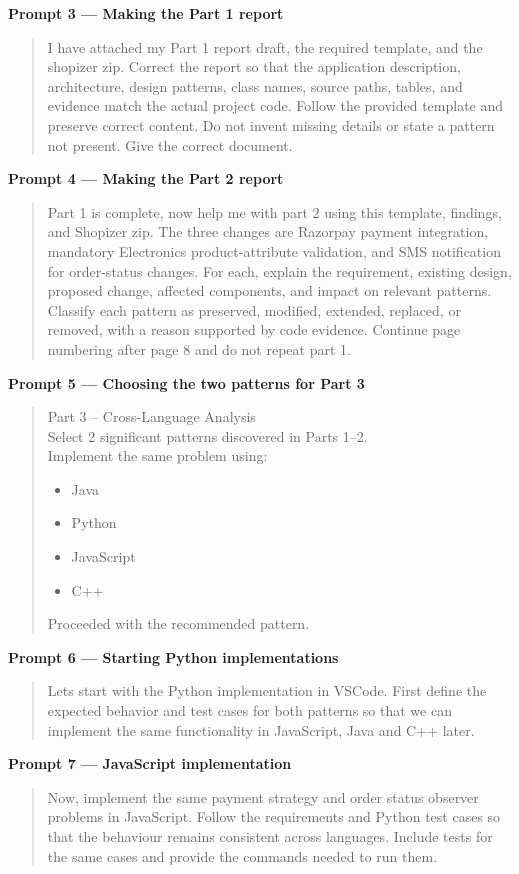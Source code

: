 \documentclass[11pt,a4paper]{article}
\begin{document}
\textbf{Prompt 3 --- Making the Part 1 report}
\begin{quote}\small
I have attached my Part 1 report draft, the required template, and the shopizer zip. Correct the report so that the application description, architecture, design patterns, class names, source paths, tables, and evidence match the actual project code. Follow the provided template and preserve correct content. Do not invent missing details or state a pattern not present. Give the correct document.
\end{quote}

\textbf{Prompt 4 --- Making the Part 2 report}
\begin{quote}\small
Part 1 is complete, now help me with part 2 using this template, findings, and Shopizer zip. The three changes are Razorpay payment integration, mandatory Electronics product-attribute validation, and SMS notification for order-status changes. For each, explain the requirement, existing design, proposed change, affected components, and impact on relevant patterns. Classify each pattern as preserved, modified, extended, replaced, or removed, with a reason supported by code evidence. Continue page numbering after page 8 and do not repeat part 1.
\end{quote}

\textbf{Prompt 5 --- Choosing the two patterns for Part 3}
\begin{quote}\small
Part 3 -- Cross-Language Analysis\\
Select 2 significant patterns discovered in Parts 1--2.\\
Implement the same problem using:
\begin{itemize}[nosep]
  \item Java
  \item Python
  \item JavaScript
  \item C++
\end{itemize}
Proceeded with the recommended pattern.
\end{quote}

\textbf{Prompt 6 --- Starting Python implementations}
\begin{quote}\small
Lets start with the Python implementation in VSCode. First define the expected behavior and test cases for both patterns so that we can implement the same functionality in JavaScript, Java and C++ later.
\end{quote}

\textbf{Prompt 7 --- JavaScript implementation}
\begin{quote}\small
Now, implement the same payment strategy and order status observer problems in JavaScript. Follow the requirements and Python test cases so that the behaviour remains consistent across languages. Include tests for the same cases and provide the commands needed to run them.
\end{quote}
\end{document}
